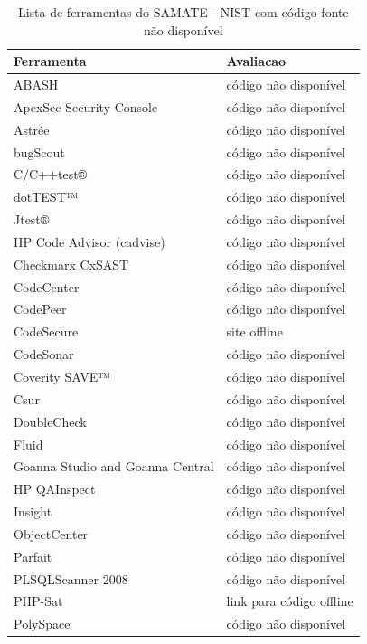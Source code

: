 \documentclass[12pt]{article}
\begin{document}
\begin{table}
\caption{Lista de ferramentas do SAMATE - NIST com código fonte não disponível}
\centering
\begin{tabular}{| l | l |}
\hline
Ferramenta & Avaliacao  \\
\hline
ABASH                     & código não disponível \\
ApexSec Security Console  & código não disponível \\
Astrée                    & código não disponível \\
bugScout                  & código não disponível \\
C/C++test®                & código não disponível \\
dotTEST™                  & código não disponível \\
Jtest®                    & código não disponível \\
HP Code Advisor (cadvise) & código não disponível \\
Checkmarx CxSAST          & código não disponível \\
CodeCenter                & código não disponível \\
CodePeer                  & código não disponível \\
CodeSecure                & site offline \\
CodeSonar                 & código não disponível \\
Coverity SAVE™            & código não disponível \\
Csur                      & código não disponível \\
DoubleCheck               & código não disponível \\
Fluid                     & código não disponível \\
Goanna Studio and Goanna Central & código não disponível \\
HP QAInspect              & código não disponível \\
Insight                   & código não disponível \\
ObjectCenter              & código não disponível \\
Parfait                   & código não disponível \\
PLSQLScanner 2008         & código não disponível \\
PHP-Sat                   & link para código offline \\
PolySpace                 & código não disponível \\

\end{tabular}
\end{table}
\end{document}
